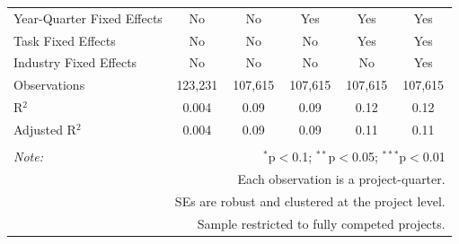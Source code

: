 \documentclass[
]{article}
\begin{document}
\begin{table}[H]
\begin{tabular}{@{\extracolsep{-2pt}}lccccc}
Year-Quarter Fixed Effects & No & No & Yes & Yes & Yes \\ 
Task Fixed Effects & No & No & No & Yes & Yes \\ 
Industry Fixed Effects & No & No & No & No & Yes \\ 
Observations & 123,231 & 107,615 & 107,615 & 107,615 & 107,615 \\ 
R$^{2}$ & 0.004 & 0.09 & 0.09 & 0.12 & 0.12 \\ 
Adjusted R$^{2}$ & 0.004 & 0.09 & 0.09 & 0.11 & 0.11 \\ 
\hline 
\hline \\[-1.8ex] 
\textit{Note:}  & \multicolumn{5}{r}{$^{*}$p$<$0.1; $^{**}$p$<$0.05; $^{***}$p$<$0.01} \\ 
 & \multicolumn{5}{r}{Each observation is a project-quarter.} \\ 
 & \multicolumn{5}{r}{SEs are robust and clustered at the project level.} \\ 
 & \multicolumn{5}{r}{Sample restricted to fully competed projects.} \\ 
\end{tabular} 
\end{table}
\end{document}

